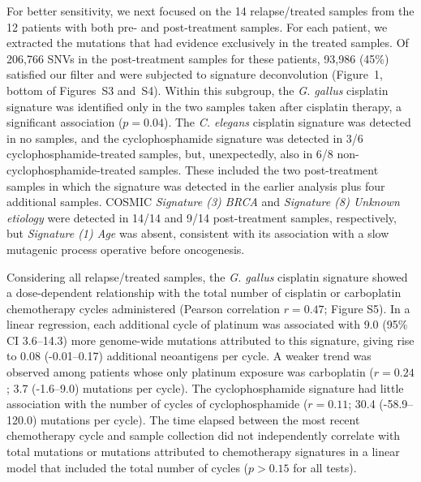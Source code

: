 \documentclass{bmcart}
\begin{document}
For better sensitivity, we next focused on the 14 relapse/treated samples from the 12 patients with both pre- and post-treatment samples. For each patient, we extracted the mutations that had evidence exclusively in the treated samples. Of 206,766 SNVs in the post-treatment samples for these patients, 93,986 (45\%) satisfied our filter and were subjected to signature deconvolution (Figure~1, bottom of Figures~S3 and~S4). Within this subgroup, the \textit{G. gallus} cisplatin signature was identified only in the two samples taken after cisplatin therapy, a significant association ($p = 0.04$). The \textit{C. elegans} cisplatin signature was detected in no samples, and the cyclophosphamide signature was detected in 3/6 cyclophosphamide-treated samples, but, unexpectedly, also in 6/8 non-cyclophosphamide-treated samples. These included the two post-treatment samples in which the signature was detected in the earlier analysis plus four additional samples. COSMIC \textit{Signature (3) BRCA} and \textit{Signature (8) Unknown etiology} were detected in 14/14 and 9/14 post-treatment samples, respectively, but \textit{Signature (1) Age} was absent, consistent with its association with a slow mutagenic process operative before oncogenesis.

Considering all relapse/treated samples, the \textit{G. gallus} cisplatin signature showed a dose-dependent relationship with the total number of cisplatin or carboplatin chemotherapy cycles administered (Pearson correlation $r=0.47$; Figure S5). In a linear regression, each additional cycle of platinum was associated with 9.0 (95\% CI 3.6--14.3) more genome-wide mutations attributed to this signature, giving rise to 0.08 (-0.01--0.17) additional neoantigens per cycle. A weaker trend was observed among patients whose only platinum exposure was carboplatin ($r=0.24$; 3.7 (-1.6--9.0) mutations per cycle). The cyclophosphamide signature had little association with the number of cycles of cyclophosphamide ($r=0.11$; 30.4 (-58.9--120.0) mutations per cycle). The time elapsed between the most recent chemotherapy cycle and sample collection did not independently correlate with total mutations or mutations attributed to chemotherapy signatures in a linear model that included the total number of cycles ($p > 0.15$ for all tests).

\end{document}
